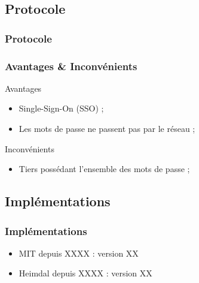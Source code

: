 \documentclass[svgnames]{beamer}
\begin{document}
\subsection{Protocole}

\begin{frame}
 \frametitle{Protocole}
 
\end{frame}

\begin{frame}
 \frametitle{Avantages \& Inconvénients}
 
 \begin{exampleblock}{Avantages}
  \begin{itemize}
   \item Single-Sign-On (SSO) ;
   \item Les mots de passe ne passent pas par le réseau ;
  \end{itemize}
 \end{exampleblock}
 
 \pause
 
 \begin{alertblock}{Inconvénients}
  \begin{itemize}
   \item Tiers possédant l'ensemble des mots de passe ;
  \end{itemize}
 \end{alertblock}
\end{frame}

\subsection{Implémentations}

\begin{frame}
  \frametitle{Implémentations}
  
  \begin{itemize}
   \item MIT depuis XXXX : version XX %
   \item Heimdal depuis XXXX : version XX %
  \end{itemize}
  
  
\end{frame}
\end{document}
